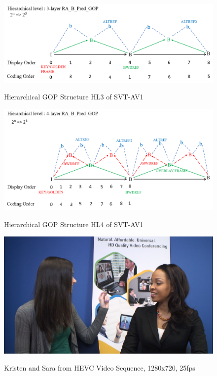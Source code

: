 \documentclass{book}
\begin{document}
\begin{figure}[hbt!]
	\centering
	{\includegraphics[width=\columnwidth]{pictures/ch6/SVT-AV1_HL3_GOP.png}
		\label{fig:SVT-AV1-HL3}}
	\caption{Hierarchical GOP Structure HL3 of SVT-AV1} \cite{SVTAV1design}
\end{figure}

\begin{figure}[hbt!]
	\centering
	{\includegraphics[width=\columnwidth]{pictures/ch6/SVT-AV1_HL4_GOP.png}
		\label{fig:SVT-AV1-HL4}}
	\caption{Hierarchical GOP Structure HL4 of SVT-AV1} \cite{SVTAV1design}
\end{figure}


\begin{figure}[h!]
	\centering
	{\includegraphics[width=\columnwidth]{pictures/ch6/KrsitenandSara.png}
		\label{fig:SVT-AV1_KandS}}
	\caption{Kristen and Sara from HEVC \cite{HEVCTestvideo} Video Sequence, 1280x720, 25fps}
\end{figure}
\end{document}

